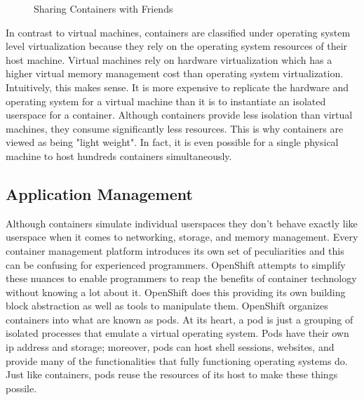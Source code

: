 \documentclass{article}
\begin{document}
\begin{figure}
\caption{Sharing Containers with Friends} 
\end{figure}
In contrast to virtual machines, containers are classified under operating system level virtualization because they rely on the operating system resources of their host machine. Virtual machines rely on hardware virtualization which has a higher virtual memory management cost than operating system virtualization. Intuitively, this makes sense. It is more expensive to replicate the hardware and operating system for a virtual machine than it is to instantiate an isolated userspace for a container. Although containers provide less isolation than virtual machines, they consume significantly less resources. This is why containers are viewed as being "light weight". In fact, it is even possible for a single physical machine to host hundreds containers simultaneously. %

\subsection{Application Management}
Although containers simulate individual userspaces they don't behave exactly like userspace when it comes to networking, storage, and memory management. Every container management platform introduces its own set of peculiarities and this can be confusing for experienced programmers. OpenShift attempts to simplify these nuances to enable programmers to reap the benefits of container technology without knowing a lot about it. OpenShift does this providing its own building block abstraction as well as tools to manipulate them. OpenShift organizes containers into what are known as pods. At its heart, a pod is just a grouping of isolated processes that emulate a virtual operating system. Pods have their own ip address and storage; moreover, pods can host shell sessions, websites, and provide many of the functionalities that fully functioning operating systems do. Just like containers, pods reuse the resources of its host to make these things possile.
\end{document}
